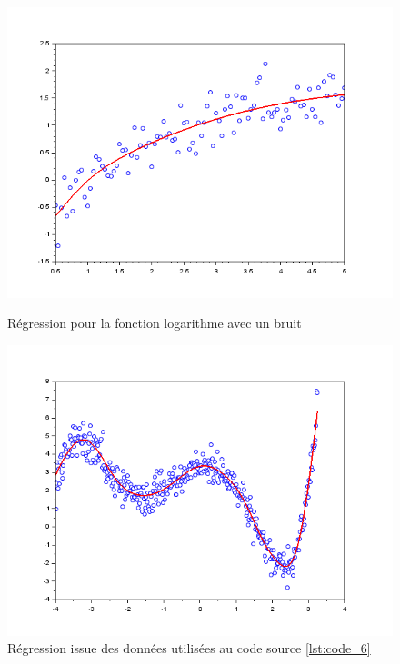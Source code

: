     \begin{figure}[H]
        \centering
        \begin{minipage}[H]{0.48\textwidth}
            \includegraphics[width=\textwidth]{images/rdn_log.png}
            \caption{Régression pour la fonction logarithme avec un bruit}
        \end{minipage}
        \hfill
        \begin{minipage}[H]{0.48\textwidth}
            \includegraphics[width=\textwidth]{images/rdn_poly.png}
            \caption{Régression issue des données utilisées au code source \ref{lst:code_6}}
        \end{minipage}
    \end{figure}
